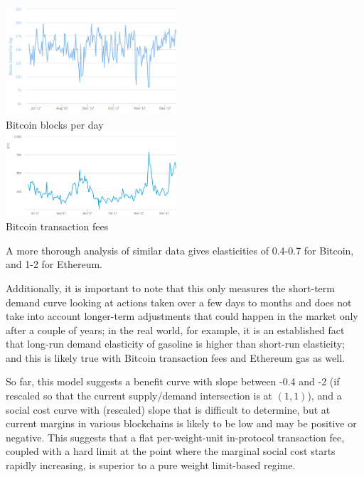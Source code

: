 \documentclass[12pt, final]{article}
\begin{document}
\begin{center}
\includegraphics[width=2.5in]{bitcoin1.png} \\
Bitcoin blocks per day \\
\includegraphics[width=2.5in]{bitcoin2.png} \\
Bitcoin transaction fees
\label{fig:three}
\end{center}

A more thorough analysis of similar data\cite{demand-elasticity} gives elasticities of 0.4-0.7 for Bitcoin, and 1-2 for Ethereum.

Additionally, it is important to note that this only measures the short-term demand curve looking at actions taken over a few days to months and does not take into account longer-term adjustments that could happen in the market only after a couple of years; in the real world, for example, it is an established fact that long-run demand elasticity of gasoline is higher than short-run elasticity\cite{env-econ}; and this is likely true with Bitcoin transaction fees and Ethereum gas as well.

So far, this model suggests a benefit curve with slope between -0.4 and -2 (if rescaled so that the current supply/demand intersection is at $(1, 1)$), and a social cost curve with (rescaled) slope that is difficult to determine, but at current margins in various blockchains is likely to be low and may be positive or negative. This suggests that a flat per-weight-unit in-protocol transaction fee, coupled with a hard limit at the point where the marginal social cost starts rapidly increasing, is superior to a pure weight limit-based regime.
\end{document}
